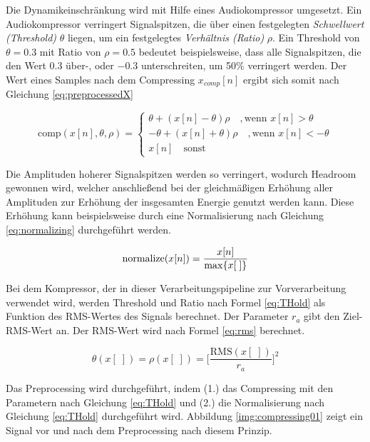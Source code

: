 Die Dynamikeinschränkung wird mit Hilfe eines Audiokompressor umgesetzt. Ein Audiokompressor verringert Signalspitzen, die über einen festgelegten \emph{Schwellwert (Threshold)} $\theta$ liegen, um ein festgelegtes \emph{Verhältnis (Ratio)} $\rho$. Ein Threshold von $\theta = 0.3$ mit Ratio von $\rho = 0.5$ bedeutet beispielsweise, dass alle Signalspitzen, die den Wert 0.3 über-, oder $-0.3$ unterschreiten, um 50\% verringert werden. Der Wert eines Samples nach dem Compressing $x_{comp}[n]$ ergibt sich somit nach Gleichung \ref{eq:preprocessedX}

\begin{equation}
\text{comp}(x[n], \theta, \rho) =
\begin{cases}
\theta + (x[n] - \theta) \rho \quad , \text{wenn } x[n] > \theta \\
-\theta + (x[n] + \theta) \rho \quad, \text{wenn } x[n] < -\theta \\
x[n] \quad \text{sonst}
\end{cases}
\label{eq:preprocessedX}
\end{equation}

Die Amplituden hoherer Signalspitzen werden so verringert, wodurch Headroom gewonnen wird, welcher anschließend bei der gleichmäßigen Erhöhung aller Amplituden zur Erhöhung der insgesamten Energie genutzt werden kann. Diese Erhöhung kann beispielsweise durch eine Normalisierung nach Gleichung \ref{eq:normalizing} durchgeführt werden.

\begin{equation}
\text{normalize}(x[n]) = \frac{x[n]}{\operatorname*{max}\{x[\;]\}}
\label{eq:normalizing}
\end{equation}

Bei dem Kompressor, der in dieser Verarbeitungspipeline zur Vorverarbeitung verwendet wird, werden Threshold und Ratio nach Formel \ref{eq:THold} als Funktion des RMS-Wertes des Signals berechnet. Der Parameter $r_a$ gibt den Ziel-RMS-Wert an. Der RMS-Wert wird nach Formel \ref{eq:rms} berechnet.

\begin{equation}
\theta(x[\;]) = \rho(x[\;])  = \bigg[\frac{\text{RMS}(x[\;])}{r_a}\bigg]^{2}
\label{eq:THold}
\end{equation}

Das Preprocessing wird durchgeführt, indem (1.) das Compressing mit den Parametern nach Gleichung \ref{eq:THold} und (2.) die Normalisierung nach Gleichung \ref{eq:THold} durchgeführt wird. Abbildung \ref{img:compressing01} zeigt ein Signal vor und nach dem Preprocessing nach diesem Prinzip.

